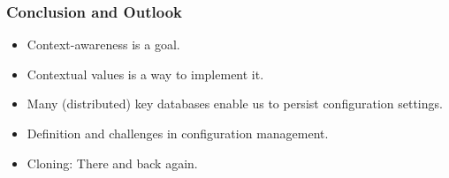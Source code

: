 \begin{frame}
	\frametitle{Conclusion and Outlook}

	\begin{itemize}[<+-| alert@+>]
	\item Context-awareness is a goal.
	\item Contextual values is a way to implement it.
	\item Many (distributed) key databases enable us to persist configuration settings.
	\item Definition and challenges in configuration management.
	\item Cloning: There and back again.
	\end{itemize}
\end{frame}






\nocite{raab2017introducing}

\appendix

\begin{frame}[allowframebreaks]
	
	
\end{frame}




